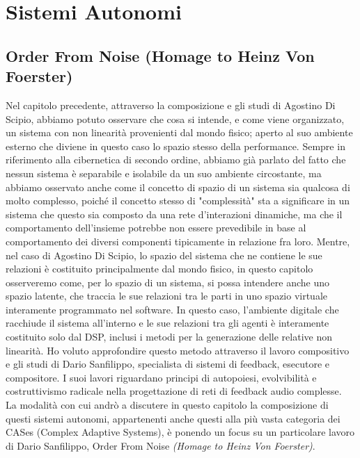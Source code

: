 \section{Sistemi Autonomi}
\label{sec:Sistemi Autonomi}

\subsection{Order From Noise (Homage to Heinz Von Foerster)}
\label{sec:Order From Noise (Homage to Heinz Von Foerster)}

Nel capitolo precedente, attraverso la composizione e gli studi di Agostino Di Scipio, 
abbiamo potuto osservare che cosa si intende, e come viene organizzato, 
un sistema con non linearità provenienti dal mondo fisico; aperto al suo ambiente esterno 
che diviene in questo caso lo spazio stesso della performance.
Sempre in riferimento alla cibernetica di secondo ordine,
abbiamo già parlato del fatto che nessun sistema è separabile e 
isolabile da un suo ambiente circostante, 
ma abbiamo osservato anche come il concetto di spazio di un sistema sia 
qualcosa di molto complesso, poiché il concetto stesso di "complessità"
sta a significare in un sistema che questo sia composto da una rete d'interazioni dinamiche, 
ma che il comportamento dell'insieme potrebbe non essere prevedibile in base al comportamento 
dei diversi componenti tipicamente in relazione fra loro.
Mentre, nel caso di Agostino Di Scipio, lo spazio del sistema che ne contiene le sue relazioni 
è costituito principalmente dal mondo fisico, 
in questo capitolo osserveremo come, per lo spazio di un sistema, 
si possa intendere anche uno spazio latente, 
che traccia le sue relazioni tra le parti in uno spazio virtuale interamente programmato nel software. 
In questo caso, l'ambiente digitale che racchiude il sistema all'interno e le sue relazioni 
tra gli agenti è interamente costituito solo dal DSP, 
inclusi i metodi per la generazione delle relative non linearità.
Ho voluto approfondire questo metodo attraverso il lavoro compositivo e gli studi di Dario Sanfilippo, 
specialista di sistemi di feedback, esecutore e compositore. 
I suoi lavori riguardano principi di autopoiesi, evolvibilità e costruttivismo radicale nella progettazione 
di reti di feedback audio complesse. \\
La modalità con cui andrò a discutere in questo capitolo la composizione di questi
sistemi autonomi, appartenenti anche questi alla più vasta categoria dei CASes (Complex Adaptive Systems), 
è ponendo un focus su un particolare lavoro di Dario Sanfilippo, Order From Noise \textit{(Homage to Heinz Von Foerster)}. \\
